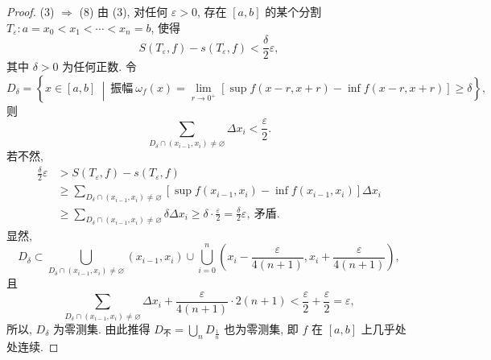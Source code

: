 \begin{proof}
(3) $\Rightarrow$ (8) 由 (3), 对任何 $\varepsilon>0$, 存在 $[a,b]$ 的某个分割 $T_{\varepsilon}:a=x_{0}<x_{1}<\cdots<x_{n}=b$, 使得
\[
S(T_{\varepsilon},f)-s(T_{\varepsilon},f)<\frac{\delta}{2}\varepsilon,
\]
其中 $\delta>0$ 为任何正数. 令
\[
D_{\delta}=\left\{x\in[a,b]\ \middle|\ \text{振幅}\ \omega_{f}(x)=\lim_{r\to 0^{+}}\left[\sup f(x-r,x+r)-\inf f(x-r,x+r)\right]\geqslant\delta\right\},
\]
则
\[
\sum_{D_{\delta}\cap(x_{i-1},x_{i})\neq\varnothing}\Delta x_{i}<\frac{\varepsilon}{2}.
\]
若不然,
\begin{align*}
\frac{\delta}{2}\varepsilon&>S(T_{\varepsilon},f)-s(T_{\varepsilon},f)\\
&\geqslant\sum_{D_{\delta}\cap(x_{i-1},x_{i})\neq\varnothing}\left[\sup f(x_{i-1},x_{i})-\inf f(x_{i-1},x_{i})\right]\Delta x_{i}\\
&\geqslant\sum_{D_{\delta}\cap(x_{i-1},x_{i})\neq\varnothing}\delta\Delta x_{i}\geqslant\delta\cdot\frac{\varepsilon}{2}=\frac{\delta}{2}\varepsilon,\ \text{矛盾}.
\end{align*}
显然,
\[
D_{\delta}\subset\bigcup_{D_{\delta}\cap(x_{i-1},x_{i})\neq\varnothing}(x_{i-1},x_{i})\cup\bigcup_{i=0}^{n}\left(x_{i}-\frac{\varepsilon}{4(n+1)},x_{i}+\frac{\varepsilon}{4(n+1)}\right),
\]
且
\[
\sum_{D_{\delta}\cap(x_{i-1},x_{i})\neq\varnothing}\Delta x_{i}+\frac{\varepsilon}{4(n+1)}\cdot 2(n+1)<\frac{\varepsilon}{2}+\frac{\varepsilon}{2}=\varepsilon,
\]
所以, $D_{\delta}$ 为零测集. 由此推得 $D_{\text{不}}=\bigcup_{n}D_{\frac{1}{n}}$ 也为零测集, 即 $f$ 在 $[a,b]$ 上几乎处处连续.


\end{proof}

